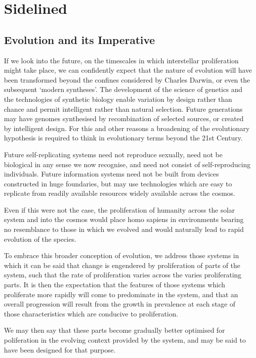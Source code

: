 \chapter{Sidelined}
\section{Evolution and its Imperative}

If we look into the future, on the timescales in which interstellar proliferation might take place, we can confidently expect that the nature of evolution will have been transformed beyond the confines considered by Charles Darwin, or even the subsequent `modern syntheses'.
The development of the science of genetics and the technologies of synthetic biology enable variation by design rather than chance and permit intelligent rather than natural selection.
Future generations may have genomes synthesised by recombination of selected sources, or created by intelligent design.
For this and other reasons a broadening of the evolutionary hypothesis is required to think in evolutionary terms beyond the 21st Century.

Future self-replicating systems need not reproduce sexually, need not be biological in any sense we now recognise, and need not consist of self-reproducing individuals.
Future information systems need not be built from devices constructed in huge foundaries, but may use technologies which are easy to replicate from readily available resources widely available across the cosmos.

Even if this were not the case, the proliferation of humanity across the solar system and into the cosmos would place homo sapiens in environments bearing no resemblance to those in which we evolved and would naturally lead to rapid evolution of the species.

To embrace this broader conception of evolution, we address those systems in which it can be said that change is engendered by proliferation of parts of the system, such that the rate of proliferation varies across the varies proliferating parts.
It is then the expectation that the features of those systems which proliferate more rapidly will come to predominate in the system, and that an overall progression will result from the growth in prevalence at each stage of those characteristics which are conducive to proliferation.

We may then say that these parts become gradually better optimised for poliferation in the evolving context provided by the system, and may be said to have been designed for that purpose.

